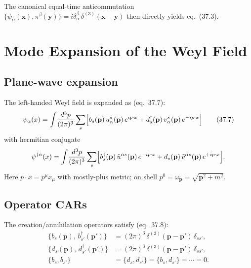 The canonical equal-time anticommutation $\{\psi_\alpha(\mathbf{x}),\pi^\beta(\mathbf{y})\}
= i\delta_\alpha^\beta\,\delta^{(3)}(\mathbf{x}-\mathbf{y})$ then directly yields eq.~(37.3).

\medskip
{}

\section{Mode Expansion of the Weyl Field}

\subsection{Plane-wave expansion}

The left-handed Weyl field is expanded as (eq.~37.7):
\begin{equation}
  \psi_\alpha(x) = \int\!\frac{d^3p}{(2\pi)^3}\sum_s
  \Bigl[b_s(\mathbf{p})\,u^s_\alpha(\mathbf{p})\,e^{ip\cdot x}
       +d^\dagger_s(\mathbf{p})\,v^s_\alpha(\mathbf{p})\,e^{-ip\cdot x}\Bigr]
  \tag{37.7}
\end{equation}
with hermitian conjugate
\begin{equation}
  \psi^{\dagger\dot\alpha}(x) = \int\!\frac{d^3p}{(2\pi)^3}\sum_s
  \Bigl[b^\dagger_s(\mathbf{p})\,\tilde u^{\dot\alpha s}(\mathbf{p})\,e^{-ip\cdot x}
       +d_s(\mathbf{p})\,\tilde v^{\dot\alpha s}(\mathbf{p})\,e^{+ip\cdot x}\Bigr].
\end{equation}
Here $p\cdot x = p^\mu x_\mu$ with mostly-plus metric; on shell $p^0 = \omega_{\mathbf{p}} = \sqrt{\mathbf{p}^2+m^2}$.

\subsection{Operator CARs}

The creation/annihilation operators satisfy (eq.~37.8):
\begin{align}
  \{b_s(\mathbf{p}),\,b^\dagger_{s'}(\mathbf{p}')\}
  &= (2\pi)^3\,\delta^{(3)}(\mathbf{p}-\mathbf{p}')\,\delta_{ss'},
  \tag{37.8a}\\
  \{d_s(\mathbf{p}),\,d^\dagger_{s'}(\mathbf{p}')\}
  &= (2\pi)^3\,\delta^{(3)}(\mathbf{p}-\mathbf{p}')\,\delta_{ss'},
  \tag{37.8b}\\
  \{b_s,b_{s'}\} &= \{d_s,d_{s'}\} = \{b_s,d_{s'}\} = \cdots = 0.
  \tag{37.8c}
\end{align}

